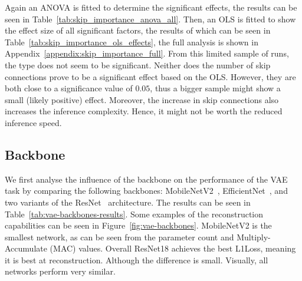 Again an ANOVA is fitted to determine the significant effects, the results can be seen in Table~\ref{tab:skip_importance_anova_all}. 
Then, an OLS is fitted to show the effect size of all significant factors, the results of which can be seen in Table~\ref{tab:skip_importance_ols_effects}, the full analysis is shown in Appendix~\ref{appendix:skip_importance_full}. From this limited sample of runs, the type does not seem to be significant. Neither does the number of skip connections prove to be a significant effect based on the OLS. However, they are both close to a significance value of $0.05$, thus a bigger sample might show a small (likely positive) effect. Moreover, the increase in skip connections also increases the inference complexity. Hence, it might not be worth the reduced inference speed.




\subsection{Backbone}
We first analyse the influence of the backbone on the performance of the VAE task by comparing the following backbones: MobileNetV2~\cite{sandler2019mobilenetv2invertedresidualslinear}, EfficientNet~\cite{tan2020efficientnetrethinkingmodelscaling}, and two variants of the ResNet~\cite{he2015deep} architecture. The results can be seen in Table~\ref{tab:vae-backbones-results}. Some examples of the reconstruction capabilities can be seen in Figure~\ref{fig:vae-backbones}. MobileNetV2 is the smallest network, as can be seen from the parameter count and Multiply-Accumulate (MAC) values. Overall ResNet18 achieves the best L1Loss, meaning it is best at reconstruction. Although the difference is small. Visually, all networks perform very similar.

